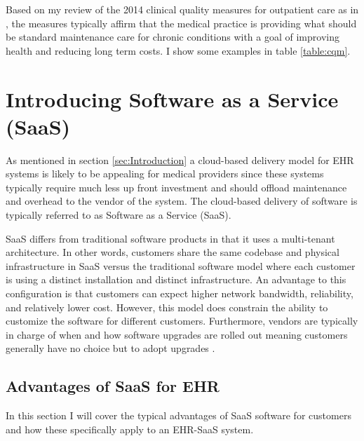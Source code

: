 \documentclass[10pt]{article}
\begin{document}
Based on my review of the 2014 clinical quality measures for outpatient care as in \cite{cqm-pdf}, the measures typically affirm that the medical practice is providing what should be standard maintenance care for chronic conditions with a goal of improving health and reducing long term costs. I show some examples in table \ref{table:cqm}.

\section{Introducing Software as a Service (SaaS)}
\label{sec:Intro_SaaS}

As mentioned in section \ref{sec:Introduction} a cloud-based delivery model for EHR systems is likely to be appealing for medical providers since these systems typically require much less up front investment and should offload maintenance and overhead to the vendor of the system.
The cloud-based delivery of software is typically referred to as Software as a Service (SaaS).

SaaS differs from traditional software products in that it uses a multi-tenant architecture.
In other words, customers share the same codebase and physical infrastructure in SaaS versus the traditional software model where each customer is using a distinct installation and distinct infrastructure.
An advantage to this configuration is that customers can expect higher network bandwidth, reliability, and relatively lower cost.
However, this model does constrain the ability to customize the software for different customers.
Furthermore, vendors are typically in charge of when and how software upgrades are rolled out meaning customers generally have no choice but to adopt upgrades \cite{saasqual}.

\subsection{Advantages of SaaS for EHR}
\label{sec:SaaS Adantages}

In this section I will cover the typical advantages of SaaS software for customers and how these specifically apply to an EHR-SaaS system.
\end{document}
